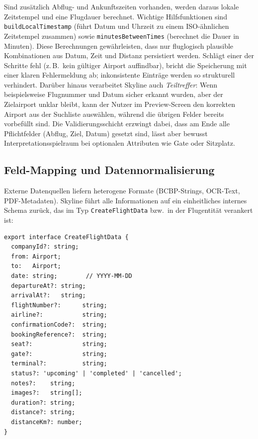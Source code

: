 Sind zusätzlich Abflug- und Ankunftszeiten vorhanden, werden daraus lokale Zeitstempel und eine Flugdauer berechnet.
Wichtige Hilfsfunktionen sind \texttt{buildLocalTimestamp} (führt Datum und Uhrzeit zu einem ISO-ähnlichen Zeitstempel zusammen) sowie \texttt{minutesBetweenTimes} (berechnet die Dauer in Minuten).
Diese Berechnungen gewährleisten, dass nur fluglogisch plausible Kombinationen aus Datum, Zeit und Distanz persistiert werden.
Schlägt einer der Schritte fehl (z.\,B.\ kein gültiger Airport auffindbar), bricht die Speicherung mit einer klaren Fehlermeldung ab; inkonsistente Einträge werden so strukturell verhindert.
Darüber hinaus verarbeitet Skyline auch \emph{Teiltreffer}:
Wenn beispielsweise Flugnummer und Datum sicher erkannt wurden, aber der Zielairport unklar bleibt, kann der Nutzer im Preview-Screen den korrekten Airport aus der Suchliste auswählen, während die übrigen Felder bereits vorbefüllt sind.
Die Validierungsschicht erzwingt dabei, dass am Ende alle Pflichtfelder (Abflug, Ziel, Datum) gesetzt sind, lässt aber bewusst Interpretationsspielraum bei optionalen Attributen wie Gate oder Sitzplatz.

\subsection{Feld-Mapping und Datennormalisierung}

Externe Datenquellen liefern heterogene Formate (BCBP-Strings, OCR-Text, PDF-Metadaten).
Skyline führt alle Informationen auf ein einheitliches internes Schema zurück, das im Typ \texttt{CreateFlightData} bzw.\ in der Flugentität verankert ist:

\begin{lstlisting}[caption={Vereinheitlichtes Payload-Schema f\"ur Fl\"uge (CreateFlightData)},label={lst:create_flight_data}]
export interface CreateFlightData {
  companyId?: string;
  from: Airport;
  to:   Airport;
  date: string;        // YYYY-MM-DD
  departureAt?: string;
  arrivalAt?:   string;
  flightNumber?:      string;
  airline?:           string;
  confirmationCode?:  string;
  bookingReference?:  string;
  seat?:              string;
  gate?:              string;
  terminal?:          string;
  status?: 'upcoming' | 'completed' | 'cancelled';
  notes?:    string;
  images?:   string[];
  duration?: string;
  distance?: string;
  distanceKm?: number;
}
\end{lstlisting}

